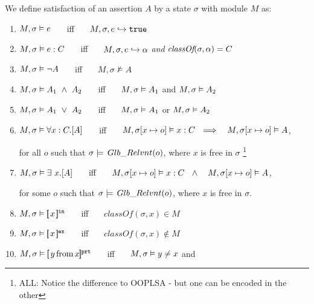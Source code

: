 \begin{definition} 
\label{def:chainmail-semantics}
We define satisfaction of an assertion $A$ by a %
state $\sigma$ with 
 module $M$ as:
\begin{enumerate}
\item
\label{cExpr}
$M , \sigma \vDash e$ \ \ \ iff \ \ \  $M, \sigma, e \hookrightarrow \texttt{true}$
\item
\label{cClass}
$M , \sigma \vDash e : C$ \ \ \ iff \ \ \  $M, \sigma, e \hookrightarrow \alpha$ \textit{and} $\textit{classOf}(\sigma, \alpha) = C$
\item
$M , \sigma \vDash \neg A$ \ \ \ iff \ \ \  ${M},{\sigma}\nvDash{A}$
\item
$\satisfiesA{M}{\sigma}{A_1\ \wedge\ A_2}$ \ \ \ iff \ \ \  $M , \sigma \vDash A_1$ and 
$M , \sigma \vDash A_2$
\item
$\satisfiesA{M}{\sigma}{A_1\ \vee\ A_2}$ \ \ \ iff \ \ \  $M , \sigma \vDash A_1$ or 
$M , \sigma \vDash A_2$
\item
\label{quant1}
$M , \sigma \vDash \forall x:C.[A]$ \ \ \ iff \ \ \  
$\satisfiesA{M}{\sigma[x \mapsto o]}{x:C} \ \ \Longrightarrow \ \ \ \satisfiesA{M}{\sigma[x \mapsto o]}{A}$, \\
\strut \hspace{1.3in}  for all  $o$ such that $\sigma \models \,Glb\_Relvnt(o)$, where $x$ is free in $\sigma$  
\footnote{ALL: Notice the difference to OOPLSA - but one can be encoded in the other}
\item
\label{quant2}
$M , \sigma \vDash \exists\ x.[A]$ \ \ \ iff \ \ \  
$\satisfiesA{M}{\sigma[x \mapsto o]}{x:C} \ \ \wedge \ \ \ \satisfiesA{M}{\sigma[x \mapsto o]}{A}$, \\
\strut \hspace{1.3in}  for some $o$ such that $\sigma \models \,Glb\_Relvnt(o)$, where $x$ is free in $\sigma$. 
\item
\label{cInternal}
$M , \sigma \vDash [\!\![ \,x\, ]\!\!]^{{\texttt{in}}}$ \ \ \ iff \ \ \   $\textit{classOf}(\sigma,x) \in M$
\item
\label{cExternal}
$M , \sigma \vDash [\!\![ \,x\, ]\!\!]^{{\texttt{ex}}}$ \ \ \ iff \ \ \   $\textit{classOf}(\sigma,x) \notin M$
\item
\label{cProtected}
$M , \sigma \vDash [\!\![ \,y\, \mbox{from}\, x]\!\!]^{{\texttt{prt}}}$  \ \ \ iff \ \ \   $M , \sigma \vDash y \neq x$  and \\

\end{enumerate}
\end{definition}
